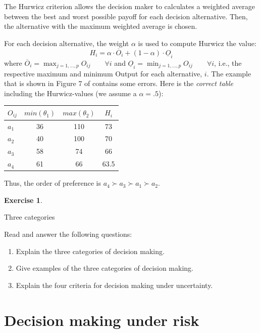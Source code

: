 \documentclass[
  12pt,
  oneside]{book}
\providecommand{\tightlist}{%
  \setlength{\itemsep}{0pt}\setlength{\parskip}{0pt}}
\theoremstyle{definition}
\theoremstyle{definition}
\theoremstyle{definition}
\newtheorem{exercise}{Exercise}[chapter]
\theoremstyle{definition}
\theoremstyle{remark}
\begin{document}
The Hurwicz criterion allows the decision maker to calculates a weighted average between the best and worst possible payoff for each decision alternative. Then, the alternative with the maximum weighted average is chosen.

For each decision alternative, the weight \(\alpha\) is used to compute Hurwicz the value:
\[H_i=\alpha \cdot \overline{O}_i + (1-\alpha)\cdot \underline{O}_i\]
where \(\overline{O}_i=\max_{j=1,\dots,p}{O_{ij}}\qquad \forall i\) and \(\underline{O}_i=\min_{j=1,\dots,p}{O_{ij}}\qquad \forall i\), i.e., the respective maximum and minimum Output for each alternative, \(i\).
The example that is shown in Figure 7 of \citet[p.401]{Finne1998three} contains some errors. Here is the \emph{correct table} including the Hurwicz-values (we assume a \(\alpha=.5\)):

\begin{longtable}[]{@{}lccc@{}}
\toprule\noalign{}
\(O_{ij}\) & \(min(\theta_1)\) & \(max(\theta_2)\) & \(H_i\) \\
\midrule\noalign{}
\endhead
\bottomrule\noalign{}
\endlastfoot
\(a_1\) & 36 & 110 & 73 \\
\(a_2\) & 40 & 100 & 70 \\
\(a_3\) & 58 & 74 & 66 \\
\(a_4\) & 61 & 66 & 63.5 \\
\end{longtable}

Thus, the order of preference is \(a_4\succ a_3 \succ a_1 \succ a_2\).

\begin{exercise}
\protect\hypertarget{exr:finne}{}\label{exr:finne}

Three categories

Read \citet{Finne1998three} and answer the following questions:

\begin{enumerate}
\def\labelenumi{\alph{enumi})}
\tightlist
\item
  Explain the three categories of decision making.
\item
  Give examples of the three categories of decision making.
\item
  Explain the four criteria for decision making under uncertainty.
\end{enumerate}

\end{exercise}

\hypertarget{decision-making-under-risk}{%
\section{Decision making under risk}\label{decision-making-under-risk}}
\end{document}

